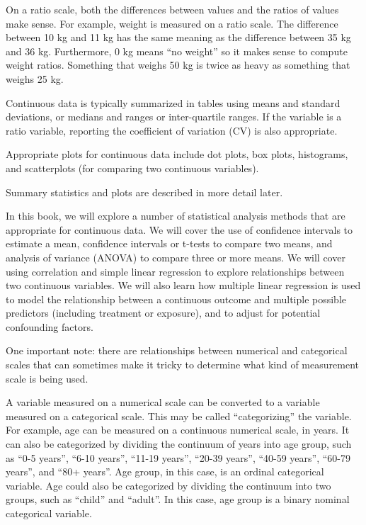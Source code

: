 \documentclass[
]{book}
\begin{document}
On a ratio scale, both the differences between values and the ratios of values make sense. For example, weight is measured on a ratio scale. The difference between 10 kg and 11 kg has the same meaning as the difference between 35 kg and 36 kg. Furthermore, 0 kg means ``no weight'' so it makes sense to compute weight ratios. Something that weighs 50 kg is twice as heavy as something that weighs 25 kg.

Continuous data is typically summarized in tables using means and standard deviations, or medians and ranges or inter-quartile ranges. If the variable is a ratio variable, reporting the coefficient of variation (CV) is also appropriate.

Appropriate plots for continuous data include dot plots, box plots, histograms, and scatterplots (for comparing two continuous variables).

Summary statistics and plots are described in more detail later.

In this book, we will explore a number of statistical analysis methods that are appropriate for continuous data. We will cover the use of confidence intervals to estimate a mean, confidence intervals or t-tests to compare two means, and analysis of variance (ANOVA) to compare three or more means. We will cover using correlation and simple linear regression to explore relationships between two continuous variables. We will also learn how multiple linear regression is used to model the relationship between a continuous outcome and multiple possible predictors (including treatment or exposure), and to adjust for potential confounding factors.

One important note: there are relationships between numerical and categorical scales that can sometimes make it tricky to determine what kind of measurement scale is being used.

A variable measured on a numerical scale can be converted to a variable measured on a categorical scale. This may be called ``categorizing'' the variable. For example, age can be measured on a continuous numerical scale, in years. It can also be categorized by dividing the continuum of years into age group, such as ``0-5 years'', ``6-10 years'', ``11-19 years'', ``20-39 years'', ``40-59 years'', ``60-79 years'', and ``80+ years''. Age group, in this case, is an ordinal categorical variable. Age could also be categorized by dividing the continuum into two groups, such as ``child'' and ``adult''. In this case, age group is a binary nominal categorical variable.
\end{document}
